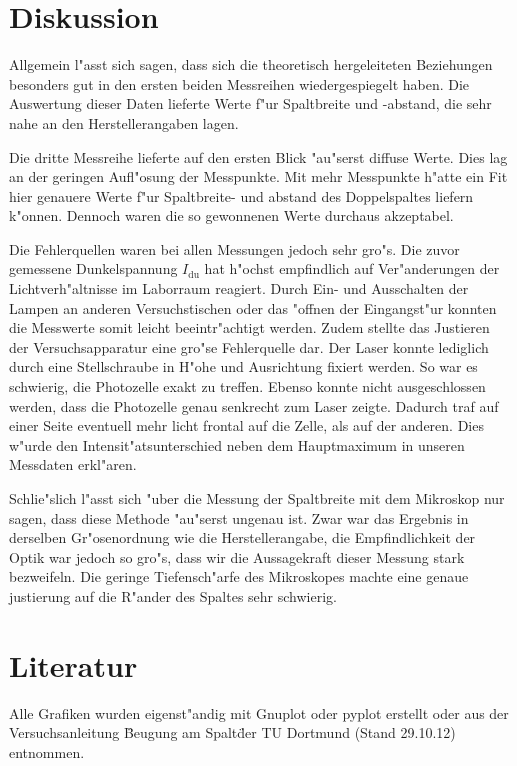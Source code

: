 \section{Diskussion}
	\label{sec:diskussion}

	Allgemein l"asst sich sagen, dass sich die theoretisch hergeleiteten Beziehungen besonders gut in den ersten beiden Messreihen wiedergespiegelt haben.
	Die Auswertung dieser Daten lieferte Werte f"ur Spaltbreite und -abstand, die sehr nahe an den Herstellerangaben lagen.

	Die dritte Messreihe lieferte auf den ersten Blick "au"serst diffuse Werte. Dies lag an der geringen Aufl"osung der Messpunkte.
	Mit mehr Messpunkte h"atte ein Fit hier genauere Werte f"ur Spaltbreite- und abstand des Doppelspaltes liefern k"onnen. Dennoch waren die so gewonnenen Werte durchaus akzeptabel.

	Die Fehlerquellen waren bei allen Messungen jedoch sehr gro"s.
	Die zuvor gemessene Dunkelspannung $I_\mathrm{du}$ hat h"ochst empfindlich auf Ver"anderungen der Lichtverh"altnisse im Laborraum reagiert.
	Durch Ein- und Ausschalten der Lampen an anderen Versuchstischen oder das "offnen der Eingangst"ur konnten die Messwerte somit leicht beeintr"achtigt werden.
	Zudem stellte das Justieren der Versuchsapparatur eine gro"se Fehlerquelle dar.
	Der Laser konnte lediglich durch eine Stellschraube in H"ohe und Ausrichtung fixiert werden.
	So war es schwierig, die Photozelle exakt zu treffen.
	Ebenso konnte nicht ausgeschlossen werden, dass die Photozelle genau senkrecht zum Laser zeigte.
	Dadurch traf auf einer Seite eventuell mehr licht frontal auf die Zelle, als auf der anderen.
	Dies w"urde den Intensit"atsunterschied neben dem Hauptmaximum in unseren Messdaten erkl"aren.

	Schlie"slich l"asst sich "uber die Messung der Spaltbreite mit dem Mikroskop nur sagen, dass diese Methode "au"serst ungenau ist.
	Zwar war das Ergebnis in derselben Gr"osenordnung wie die Herstellerangabe, die Empfindlichkeit der Optik war jedoch so gro"s, dass wir die Aussagekraft dieser Messung stark bezweifeln.
	Die geringe Tiefensch"arfe des Mikroskopes machte eine genaue justierung auf die R"ander des Spaltes sehr schwierig.

\section{Literatur}

	Alle Grafiken wurden eigenst"andig mit Gnuplot oder pyplot erstellt oder aus der Versuchsanleitung \"Beugung am Spalt\" der TU Dortmund (Stand 29.10.12) entnommen.
